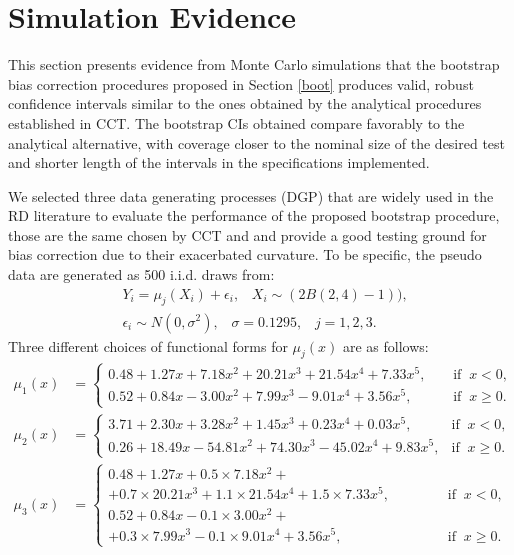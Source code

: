 \documentclass[12pt,fleqn]{article}
\begin{document}
\section{Simulation Evidence}\label{sim}

This section presents evidence from Monte Carlo simulations that the bootstrap bias correction procedures proposed in Section \ref{boot} produces valid, robust confidence intervals similar to the ones obtained by the analytical procedures established in CCT. The bootstrap CIs obtained compare favorably to the analytical alternative, with coverage closer to the nominal size of the desired test and shorter length of the intervals in the specifications implemented.

We selected three data generating processes (DGP) that are widely used in the RD literature to evaluate the performance of the proposed bootstrap procedure, those are the same chosen by CCT and \cite{IK} and provide a good testing ground for bias correction due to their exacerbated curvature. To be specific, the pseudo data are generated as 500 i.i.d. draws from:
\begin{align*}
& Y_{i} = \mu_{j}(X_{i}) + \epsilon_{i}, \;\;\; X_{i} \sim  (2 B (2,4) - 1)), \\
& \epsilon_{i} \sim N(0, \sigma^{2}), \;\;\; \sigma = 0.1295, \;\;\; j = 1,2,3.
\end{align*}
Three different choices of functional forms for $\mu_{j}(x)$ are as follows:
\begin{align}
\mu_{1}(x) & = 
\begin{cases}
0.48 + 1.27x + 7.18x^{2} + 20.21x^{3} + 21.54x^{4} + 7.33x^{5}, \;\;\;\; & \text{if} \;\; x < 0, \\
0.52 + 0.84x - 3.00x^{2} + 7.99x^3 - 9.01x^4 + 3.56x^{5},  & \text{if} \;\; x \ge 0.
\end{cases}
\\
\mu_{2}(x) & = 
\begin{cases}
3.71 + 2.30x + 3.28x^2 + 1.45x^3 + 0.23x^4 + 0.03x^5, \;\; & \text{if} \;\; x < 0, \\
0.26 + 18.49x - 54.81x^2 + 74.30x^3 - 45.02x^4 + 9.83x^5,  & \text{if} \;\; x \ge 0.
\end{cases}
\\
\mu_{3}(x) & =
\begin{cases}
0.48 + 1.27x + 0.5 \times 7.18x^{2}+ \\
+ 0.7 \times 20.21x^3 + 1.1 \times 21.54x^4 + 1.5 \times 7.33x^5, \;\;\;\;\;\;\;\;\;\;\;\; & \text{if} \;\; x < 0, \\
0.52 + 0.84x - 0.1 \times 3.00x^{2}+ \\
+ 0.3 \times 7.99x^3 - 0.1 \times 9.01x^4 + 3.56x^5, & \text{if} \;\; x \ge 0.
\end{cases}
\end{align}
\end{document}

